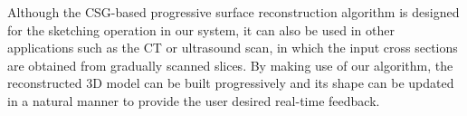 Although the CSG-based progressive surface reconstruction  algorithm
is designed for the sketching operation in our system, it can also
be used in other applications such as the CT or ultrasound scan, in
which the input cross sections are obtained from gradually scanned
slices. By making use of our algorithm, the reconstructed 3D model
can be built progressively and its shape can be updated in a natural
manner to provide the user desired real-time feedback.
